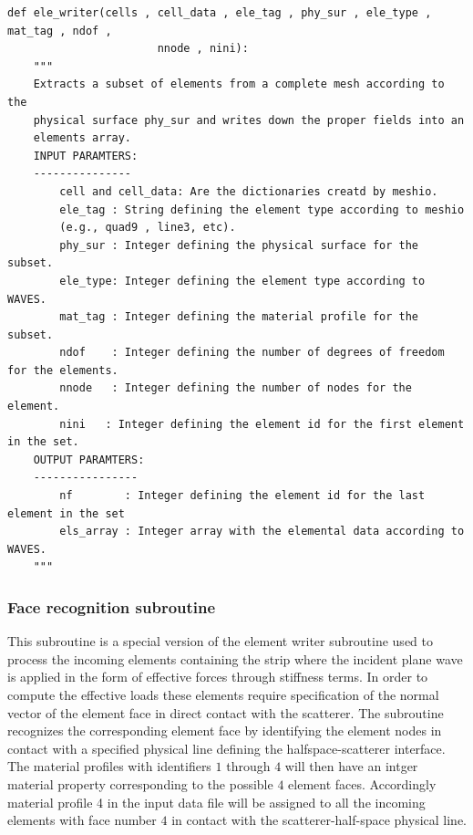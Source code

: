 \documentclass[12pt,letterpaper]{article}
\begin{document}
\begin{verbatim}
def ele_writer(cells , cell_data , ele_tag , phy_sur , ele_type , mat_tag , ndof ,
                       nnode , nini):
    """
    Extracts a subset of elements from a complete mesh according to the
    physical surface phy_sur and writes down the proper fields into an
    elements array.
    INPUT PARAMTERS:
    ---------------
        cell and cell_data: Are the dictionaries creatd by meshio.
        ele_tag : String defining the element type according to meshio 
        (e.g., quad9 , line3, etc).
        phy_sur : Integer defining the physical surface for the subset.
        ele_type: Integer defining the element type according to WAVES.
        mat_tag : Integer defining the material profile for the subset.
        ndof    : Integer defining the number of degrees of freedom for the elements.
        nnode   : Integer defining the number of nodes for the element.
        nini   : Integer defining the element id for the first element in the set.
    OUTPUT PARAMTERS:
    ----------------
        nf        : Integer defining the element id for the last element in the set
        els_array : Integer array with the elemental data according to WAVES.
    """
\end{verbatim}


\subsubsection*{Face recognition subroutine}
This subroutine is a special version of the element writer subroutine used to process the incoming elements containing the strip where the incident plane wave is applied in the form of effective forces through stiffness terms. In order to compute the effective loads these elements require specification of the normal vector of the element face in direct contact with the scatterer. The subroutine recognizes the corresponding element face by identifying the element nodes in contact with a specified physical line defining the halfspace-scatterer interface. The material profiles with identifiers $1$ through $4$ will then have an intger material property corresponding to the possible $4$ element faces. Accordingly material profile 4 in the input data file will be assigned to all the incoming elements with face number $4$ in contact with the scatterer-half-space physical line.
\end{document}
